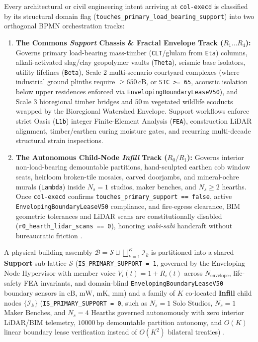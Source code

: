Every architectural or civil engineering intent arriving at \texttt{col-execd} is classified by its structural domain flag
(\texttt{touches\_primary\_load\_bearing\_support}) into two orthogonal BPMN orchestration tracks:
\begin{enumerate}
    \item \textbf{The Commons \emph{Support} Chassis \& Fractal Envelope Track ($R_1 \dots R_4$):} Governs primary load-bearing mass-timber (\texttt{CLT}/glulam from
    \texttt{Eta}) columns, alkali-activated slag/clay geopolymer vaults (\texttt{Theta}), seismic base isolators, utility lifelines
    (\texttt{Beta}), Scale 2 multi-scenario courtyard complexes (where industrial ground plinths require $\ge 650\,\mathrm{cB}$, or \texttt{STC
    >= 65}, acoustic isolation below upper residences enforced via \texttt{EnvelopingBoundaryLeaseV50}), and Scale 3 bioregional timber bridges and $50\,\mathrm{m}$ vegetated wildlife ecoducts wrapped by the Bioregional Watershed Envelope.
    Support workflows enforce strict Oasis (\texttt{L1b}) integer Finite-Element Analysis (\texttt{FEA}), construction LiDAR alignment,
    timber/earthen curing moisture gates, and recurring multi-decade structural strain inspections.
    \item \textbf{The Autonomous Child-Node \emph{Infill} Track ($R_0 / R_1$):} Governs interior non-load-bearing demountable partitions,
    hand-sculpted earthen cob window seats, heirloom broken-tile mosaics, carved doorjambs, and mineral-ochre murals (\texttt{Lambda}) inside
    $N_s = 1$ studios, maker benches, and $N_s \ge 2$ hearths. Once \texttt{col-execd} confirms \texttt{touches\_primary\_support == false},
    active \texttt{EnvelopingBoundaryLeaseV50} compliance, and fire-egress clearance, BIM geometric tolerances and LiDAR scans
    are constitutionally disabled (\texttt{r0\_hearth\_lidar\_scans == 0}), honoring \emph{wabi-sabi} handcraft without bureaucratic friction
    \parencite{illich1973,weiser1996calm}.
\end{enumerate}

\begin{definition}
\label{def:xi-habraken}
A physical building assembly $\mathcal{B} = \mathcal{S} \sqcup \bigsqcup_{k=1}^{K} \mathcal{I}_k$ is partitioned into a shared \textbf{Support} sub-lattice
$\mathcal{S}$ (\texttt{IS\_PRIMARY\_SUPPORT = 1}, governed by the Enveloping Node Hypervisor with member voice $V_i(t) = 1 + R_i(t)$ across
$N_{\mathrm{envelope}}$, life-safety FEA invariants, and domain-blind \texttt{EnvelopingBoundaryLeaseV50} boundary sensors in $\mathrm{cB}$,
$\mathrm{mW}$, $\mathrm{mK}$, $\mathrm{mm}$) and a family of $K$ co-located \textbf{Infill} child nodes $\{\mathcal{I}_k\}$
(\texttt{IS\_PRIMARY\_SUPPORT = 0}, such as $N_s = 1$ Solo Studios, $N_s = 1$ Maker Benches, and $N_s = 4$ Hearths governed autonomously with zero
interior LiDAR/BIM telemetry, $10000\,\mathrm{bp}$ demountable partition autonomy, and $O(K)$ linear boundary lease verification instead of $O(K^2)$
bilateral treaties) \parencite{habraken1972supports}.
\end{definition}

